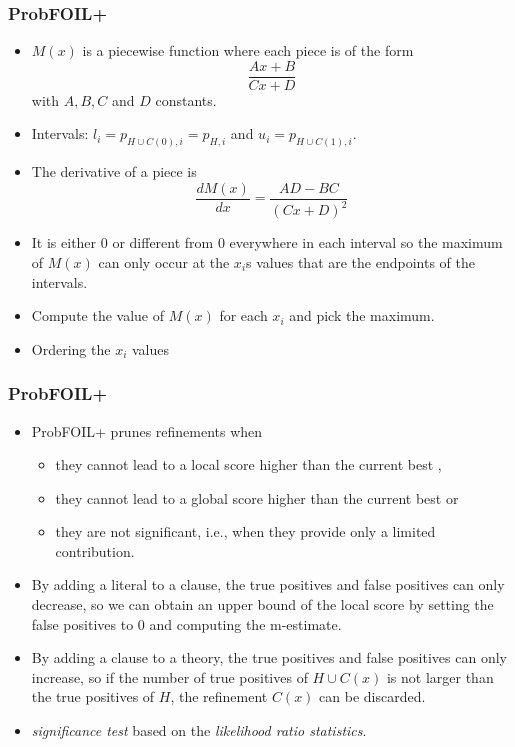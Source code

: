 \documentclass[trans,aspectratio=1610]{beamer}
\newcommand{\TP}{\mathit{TP}}
\newcommand{\FP}{\mathit{FP}}
\begin{document}
\begin{frame}
\frametitle{ProbFOIL+}
\begin{itemize}
\item 
 $M(x)$ is a piecewise function where each piece is of the form
$$\frac{Ax+B}{Cx+D}$$
with $A, B, C$ and $D$ constants. 
\item Intervals: $l_i=p_{H\cup C(0),i}=p_{H,i}$ and $u_i=p_{H\cup C(1),i}$.
\item The derivative of a piece is
$$\frac{dM(x)}{dx}=\frac{AD-BC}{(Cx+D)^2}$$
\item It is either 0 or different from 0 everywhere in each interval so the maximum of $M(x)$ can only occur at  the $x_i$s values that are the endpoints of the intervals.
\item Compute the value of $M(x)$ for each $x_i$ and pick the 
maximum. 
\item Ordering the $x_i$ values
\end{itemize}
\end{frame}
\begin{frame}
\frametitle{ProbFOIL+}
\begin{itemize}
\item 
ProbFOIL+ prunes refinements when
\begin{itemize}
\item 
they cannot lead to a  local score higher than the current best ,
\item they cannot lead to a global score higher than the current best or 
\item they are not
significant, i.e., when they provide only a limited contribution.
\end{itemize}
\item
By adding a literal to a clause, the true positives and false positives can only decrease, so 
we can obtain an upper bound of the local score 
by setting the false positives to 0 and computing the m-estimate.
\item
By adding a clause to a theory, the true positives and false positives can only increase, so 
if the number of true positives of $H\cup C(x)$ is not larger than the true positives of $H$, the refinement 
$C(x)$
can be discarded.
\item  \emph{significance test}   based on the \emph{likelihood ratio statistics}.
\end{itemize}
\end{frame}
\end{document}
